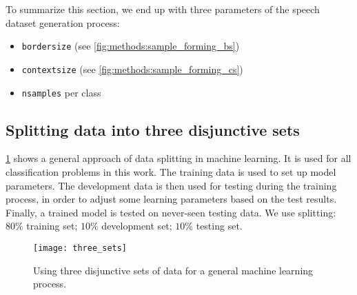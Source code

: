 To summarize this section, we end up with three parameters of the speech dataset generation process:

\begin{itemize}
\item \texttt{border\textunderscore size} (see \cref{fig:methods:sample_forming_bs})
\item \texttt{context\textunderscore size} (see \cref{fig:methods:sample_forming_cs})
\item \texttt{n\textunderscore samples} per class
\end{itemize}

\subsection*{Splitting data into three disjunctive sets}
\cref{fig:methods:three_sets} shows a general approach of data splitting in machine learning. It is used for all classification problems in this work. The training data is used to set up model parameters. The development data is then used for testing during the training process, in order to adjust some learning parameters based on the test results. Finally, a trained model is tested on never-seen testing data. We use splitting: $ 80\% $ training set; $ 10\% $ development set; $ 10\% $ testing set.

\begin{figure}[H]
\centering
\texttt{[image: three\_sets]}
\caption{Using three disjunctive sets of data for a general machine learning process.}
\label{fig:methods:three_sets}
\end{figure}